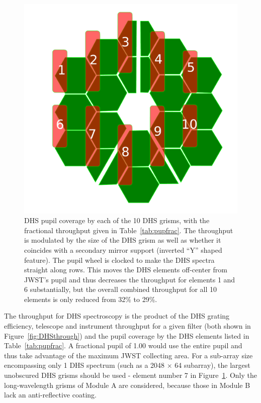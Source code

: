 \documentclass[iop]{emulateapj}
\begin{document}
\begin{figure}[!t]
\centering
\includegraphics[width=1.0\columnwidth]{dhs_pupil_labels_modA.pdf}
\caption{DHS pupil coverage by each of the 10 DHS grisms, with the fractional throughput given in Table~\ref{tab:pupfrac}. 
The throughput is modulated by the size of the DHS grism as well as whether it coincides with a secondary mirror support (inverted ``Y'' shaped feature).
The pupil wheel is clocked to make the DHS spectra straight along rows.
This moves the DHS elements off-center from JWST's pupil and thus decreases the throughput for elements 1 and 6 substantially, but the overall combined throughput for all 10 elements is only reduced from 32\% to 29\%.}\label{fig:DHSvsPupilOverlay}
\end{figure}

The throughput for DHS spectroscopy is the product of the DHS grating efficiency, telescope and instrument throughput for a given filter (both shown in Figure~\ref{fig:DHSthrough}) and the pupil coverage by the DHS elements listed in Table~\ref{tab:pupfrac}.
A fractional pupil of 1.00 would use the entire pupil and thus take advantage of the maximum JWST collecting area.
For a sub-array size encompassing only 1 DHS spectrum (such as a 2048 $\times$ 64 subarray), the largest unobscured DHS grisms should be used - element number 7 in Figure~\ref{fig:DHSvsPupilOverlay}.
Only the long-wavelength grisms of Module A are considered, because those in Module B lack an anti-reflective coating.
\end{document}
